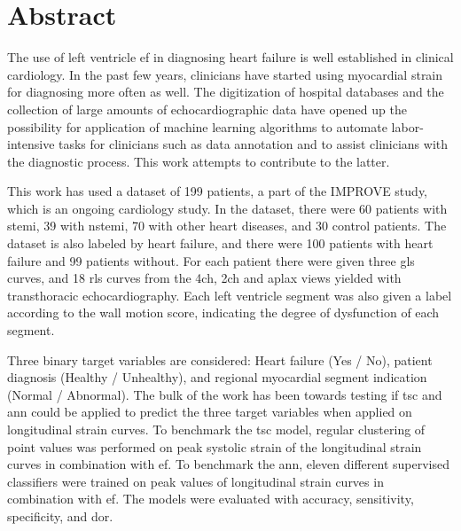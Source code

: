 \section*{Abstract}
%

The use of left ventricle \acrfull{ef} in diagnosing heart failure is well established in clinical cardiology. In the past few years, clinicians have started using myocardial strain for diagnosing more often as well. The digitization of hospital databases and the collection of large amounts of echocardiographic data have opened up the possibility for application of machine learning algorithms to automate labor-intensive tasks for clinicians such as data annotation and to assist clinicians with the diagnostic process. This work attempts to contribute to the latter. \bigskip

This work has used a dataset of 199 patients, a part of the IMPROVE study, which is an ongoing cardiology study. In the dataset, there were 60 patients with \acrlong{stemi}, 39 with \acrlong{nstemi}, 70 with other heart diseases, and 30 control patients. The dataset is also labeled by heart failure, and there were 100 patients with heart failure and 99 patients without. For each patient there were given three \acrlong{gls} curves, and 18 \acrlong{rls} curves from the \acrlong{4ch}, \acrlong{2ch} and \acrlong{aplax} views yielded with transthoracic echocardiography. Each left ventricle segment was also given a label according to the wall motion score, indicating the degree of dysfunction of each segment. \bigskip

Three binary target variables are considered: Heart failure (Yes / No), patient diagnosis (Healthy / Unhealthy), and regional myocardial segment indication (Normal / Abnormal). The bulk of the work has been towards testing if \acrfull{tsc} and \acrfull{ann} could be applied to predict the three target variables when applied on longitudinal strain curves. To benchmark the \acrshort{tsc} model, regular clustering of point values was performed on peak systolic strain of the longitudinal strain curves in combination with \acrshort{ef}. To benchmark the \acrfull{ann}, eleven different supervised classifiers were trained on peak values of longitudinal strain curves in combination with \acrshort{ef}. The models were evaluated with accuracy, sensitivity, specificity, and \acrfull{dor}. \bigskip

